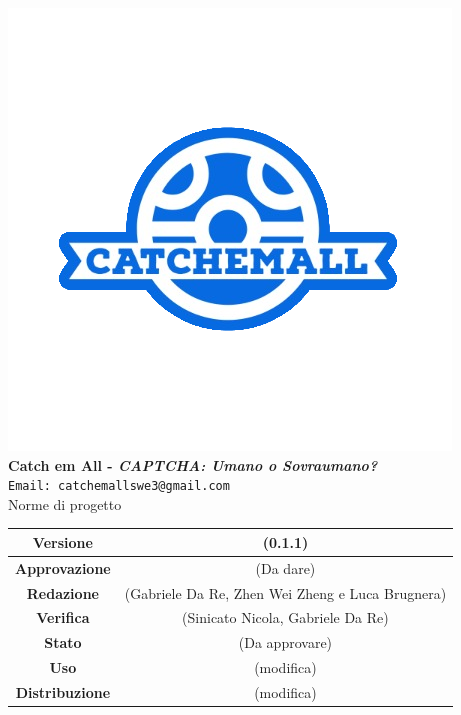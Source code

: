 \begin{titlepage}
\begin{center}
	\includegraphics[scale = 1.5]{img/logo.png}\\
	\bigskip
	\large \textbf{Catch em All - \textit{CAPTCHA: Umano o Sovraumano?}}\\
	\texttt{Email: catchemallswe3@gmail.com}\\
	\vfill
	{\fontsize{1.5cm}{0}\selectfont Norme di progetto}\\
	\vfill
	\begin{tabularx}{\textwidth}{| c | c |}
		\hline
		\textbf{Versione} & (0.1.1)\\
		\hline
		\textbf{Approvazione} & (Da dare)\\
		\hline
		\textbf{Redazione} & (Gabriele Da Re, Zhen Wei Zheng e Luca Brugnera)\\
		\hline
		\textbf{Verifica} & (Sinicato Nicola, Gabriele Da Re)\\
		\hline
		\textbf{Stato} & (Da approvare)\\
		\hline
		\textbf{Uso} & (modifica)\\
		\hline
		\textbf{Distribuzione} & (modifica)\\
		\hline
	\end{tabularx}
\end{center}
\end{titlepage}